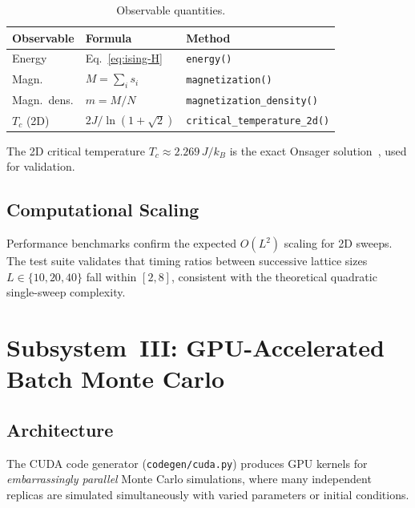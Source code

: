 \documentclass[11pt,letterpaper,twocolumn]{article}
\newcommand{\code}[1]{\texttt{#1}}
\theoremstyle{definition}
\begin{document}
\begin{table}[H]
\centering
\caption{Observable quantities.}\label{tab:observables}
\small
\setlength{\tabcolsep}{4pt}
\begin{tabular}{@{}p{1.6cm}p{2.4cm}p{2.6cm}@{}}
\toprule
\textbf{Observable} & \textbf{Formula} & \textbf{Method} \\
\midrule
Energy      & Eq.~\eqref{eq:ising-H}                  & \code{energy()} \\
Magn.       & $M = \sum_i s_i$                        & \code{magnetization()} \\
Magn.~dens. & $m = M/N$                               & \code{magnetization\_density()} \\
$T_c$ (2D)  & $2J / \ln(1{+}\sqrt{2})$                & \code{critical\_temperature\_2d()} \\
\bottomrule
\end{tabular}
\end{table}

\noindent
The 2D critical temperature $T_c \approx 2.269\,J/k_B$ is the exact Onsager solution~\cite{onsager1944}, used for validation.

\subsection{Computational Scaling}

Performance benchmarks confirm the expected $O(L^2)$ scaling for 2D sweeps.  The test suite validates that timing ratios between successive lattice sizes $L \in \{10, 20, 40\}$ fall within $[2, 8]$, consistent with the theoretical quadratic single-sweep complexity.

\section{Subsystem~III: GPU-Accelerated Batch Monte Carlo}\label{sec:cuda}

\subsection{Architecture}

The CUDA code generator (\code{codegen/cuda.py}) produces GPU kernels for \emph{embarrassingly parallel} Monte Carlo simulations, where many independent replicas are simulated simultaneously with varied parameters or initial conditions.
\end{document}
